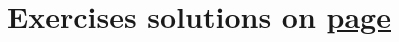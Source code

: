 


\section*{Exercises \hfill \normalfont\textsf{\small solutions on \hyperlink{solutions_glider_synthesis}{page \pageref{solutions_glider_synthesis}}}}
\label{sec:synthesis_exercises}

